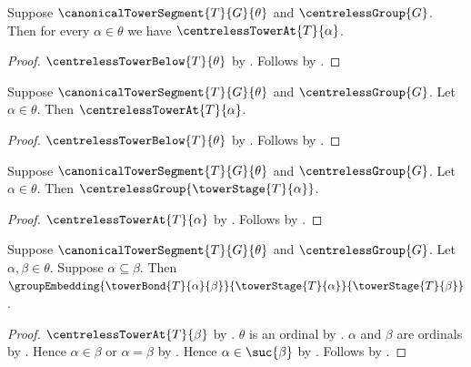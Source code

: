 \begin{theorem}\label{canonical_centreless_tower_pointwise}
    Suppose $\canonicalTowerSegment{T}{G}{\theta}$ and
        $\centrelessGroup{G}$.
    Then for every $\alpha\in\theta$ we have
        $\centrelessTowerAt{T}{\alpha}$.
\end{theorem}
\begin{proof}
    $\centrelessTowerBelow{T}{\theta}$ by
        .
    Follows by .
\end{proof}

\begin{theorem}\label{canonical_centreless_tower_at}
    Suppose $\canonicalTowerSegment{T}{G}{\theta}$ and
        $\centrelessGroup{G}$.
    Let $\alpha\in\theta$.
    Then $\centrelessTowerAt{T}{\alpha}$.
\end{theorem}
\begin{proof}
    $\centrelessTowerBelow{T}{\theta}$ by
        .
    Follows by .
\end{proof}

\begin{corollary}\label{canonical_tower_stage_centreless}
    Suppose $\canonicalTowerSegment{T}{G}{\theta}$ and
        $\centrelessGroup{G}$.
    Let $\alpha\in\theta$.
    Then $\centrelessGroup{\towerStage{T}{\alpha}}$.
\end{corollary}
\begin{proof}
    $\centrelessTowerAt{T}{\alpha}$ by
        .
    Follows by .
\end{proof}

\begin{theorem}\label{canonical_tower_bond_embedding}
    Suppose $\canonicalTowerSegment{T}{G}{\theta}$ and
        $\centrelessGroup{G}$.
    Let $\alpha,\beta\in\theta$.
    Suppose $\alpha\subseteq\beta$.
    Then $\groupEmbedding
        {\towerBond{T}{\alpha}{\beta}}
        {\towerStage{T}{\alpha}}
        {\towerStage{T}{\beta}}$.
\end{theorem}
\begin{proof}
    $\centrelessTowerAt{T}{\beta}$ by
        .
    $\theta$ is an ordinal by
        .
    $\alpha$ and $\beta$ are ordinals by
        .
    Hence $\alpha\in\beta$ or $\alpha=\beta$ by
        .
    Hence $\alpha\in\suc{\beta}$ by .
    Follows by .
\end{proof}

